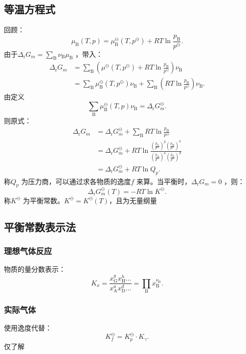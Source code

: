 \subsection{等温方程式}%
\label{sub:等温方程式}
回顾：
\[\boxed{
    \mu_\text{B}\left( T,p \right) = \mu_\text{B}^\ominus\left( T,p^\ominus \right) + RT\ln \frac{p_\text{B}}{p^\ominus}
.}\]
由于$\Delta_\text{r}G_{m} =\sum_{\text{B}}\nu_\text{B}\mu_\text{B}$ ，带入：
\begin{align*}
    \Delta_\text{r}G_{m} &= \sum_{\text{B}}\left( \mu^\ominus\left( T,p^\ominus \right) +RT\ln \frac{p_\text{B}}{p^\ominus}\right)\nu_\text{B} \\
    &= \sum_{\text{B}}\mu_\text{B}^\ominus\left( T,p^\ominus \right)\nu_\text{B} + \sum_{\text{B}}\left( RT\ln \frac{p_\text{B}}{p^\ominus} \right)\nu_\text{B}
.\end{align*}
由定义\[\boxed{
    \sum_{\text{B}}\mu_\text{B}^\ominus\left( T,p \right)\nu_\text{B} = \Delta_\text{r}G_{m}^\ominus 
.}\]
则原式：
\begin{align*}
    \Delta_\text{r}G_{m} &= \Delta_\text{r}G_{m}^\ominus + \sum_{\text{B}}RT\ln \frac{p_\text{B}}{p^\ominus}\\
    &= \Delta_\text{r}G_{m}^\ominus +RT\ln \frac{\left( \frac{p_\text{G}}{p^\ominus} \right)^{g}\left( \frac{p_\text{H}}{p^\ominus} \right)^{h}}{\left( \frac{p_\text{A}}{p^\ominus} \right)^{a}\left( \frac{p_\text{D}}{p^\ominus} \right)^{d}} \\
    &= \Delta_\text{r}G_{m}^\ominus +RT\ln Q_{p}
.\end{align*}
称$Q_{p}$ 为压力商，可以通过求各物质的逸度$f$ 来算。当平衡时，$\Delta_\text{r}G_{m} = 0 $ ，则：\[
    \Delta_\text{r}G_{m}^\ominus \left( T \right)= -RT\ln K^\ominus
.\]
称$K^\ominus$ 为平衡常数。$K^\ominus = K^\ominus\left( T \right)$，且为无量纲量
\subsection{平衡常数表示法}%
\label{sub:平衡常数表示法}
\subsubsection*{理想气体反应}%
\label{subsub*:理想气体反应}
物质的量分数表示：\[
    K_{x} = \frac{x_\text{G}^{g}x_\text{H}^{h}\ldots }{x_\text{A}^{a}x_\text{D}^{d}\ldots } = \prod_{\text{B}}^{} x_\text{B}^{\nu_{\text{B}}}
.\]
\subsubsection*{实际气体}%
\label{subsub*:实际气体}
使用逸度代替：\[
    K_{f}^\ominus = K_{p}^\ominus\cdot K_{\gamma}
.\]
仅了解

